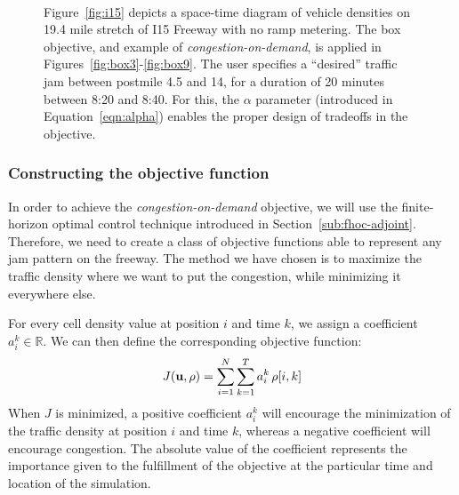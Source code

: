 \begin{figure}
\centering
{}\\
\hfill
{}\hfill
{}%
\caption{Figure~\ref{fig:i15} depicts a space-time diagram of vehicle densities on 19.4 mile stretch of I15 Freeway with no ramp metering. The box objective, and example of \emph{congestion-on-demand}, is applied in Figures~\ref{fig:box3}-\ref{fig:box9}. The user specifies a ``desired'' traffic jam between postmile 4.5 and 14, for a duration of 20 minutes between 8:20 and 8:40. For this, the $\alpha$ parameter (introduced in Equation~\eqref{eqn:alpha}) enables the proper design of tradeoffs in the objective.}
\end{figure}

\subsubsection{Constructing the objective function}
In order to achieve the \emph{congestion-on-demand} objective, we will use the finite-horizon optimal control technique introduced in Section~\ref{sub:fhoc-adjoint}. Therefore, we need to create a class of objective functions able to represent any jam pattern on the freeway. The method we have chosen is to maximize the traffic density where we want to put the congestion, while minimizing it everywhere else.

For every cell density value at position $i$ and time $k$, we assign a coefficient $a_i^k \in \mathbb{R}$. We can then define the corresponding objective function:
\begin{equation}
\label{eqn:jamondemand}
J \left( \vectorize{u}, \vectorize{\rho} \right) = \sum_{i = 1}^{N} \sum_{k = 1}^{T} a_i^k \, \rho\left[i,k\right]
\end{equation}
When $J$ is minimized, a positive coefficient $a_i^k$ will encourage the minimization of the traffic density at position $i$ and time $k$, whereas a negative coefficient will encourage congestion. The absolute value of the coefficient represents the importance given to the fulfillment of the objective at the particular time and location of the simulation.

